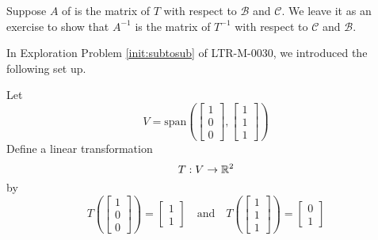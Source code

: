\documentclass{ximera}
\begin{document}
Suppose $A$ of  is  the matrix of $T$ with respect to $\mathcal{B}$ and $\mathcal{C}$.  We leave it as an exercise to show that $A^{-1}$ is the matrix of $T^{-1}$ with respect to $\mathcal{C}$ and $\mathcal{B}$.

\begin{example}\label{ex:inversematrixoftransform}
In Exploration Problem \ref{init:subtosub} of LTR-M-0030, we introduced the following set up.

Let $$V=\text{span}\left(\begin{bmatrix}1\\0\\0\end{bmatrix}, \begin{bmatrix}1\\1\\1\end{bmatrix}\right)$$
Define a linear transformation $$T:V\rightarrow \mathbb{R}^2$$
by $$T\left(\begin{bmatrix}1\\0\\0\end{bmatrix}\right)=\begin{bmatrix}1\\1\end{bmatrix}\quad \text{and} \quad T\left(\begin{bmatrix}1\\1\\1\end{bmatrix}\right)=\begin{bmatrix}0\\1\end{bmatrix}$$


\end{example}
\end{document}
